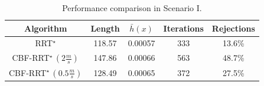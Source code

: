 \documentclass{svproc}
\begin{document}
\begin{table}[h]
\caption{Performance comparison in Scenario I.}
\begin{center}
\begin{tabular}{|c|c|c|c|c|}
    \hline
    Algorithm       & Length   & $\bar{h}(x)$    & Iterations    &   Rejections\\
    \hline
    RRT$^\star$     & 118.57    & 0.00057   & 333   & 13.6\%   \\
    \hline
    CBF-RRT$^\star\,\left(2\frac{m}{s}\right)$ & 147.86    & 0.00066   & 563   & 48.7\% \\
    \hline
    CBF-RRT$^\star\,\left(0.5\frac{m}{s}\right)$ & 128.49    & 0.00065   & 372   & 27.5\% \\
    \hline
\end{tabular}
\end{center}
\label{tab:performance_scenario_i}
\end{table}

\end{document}
